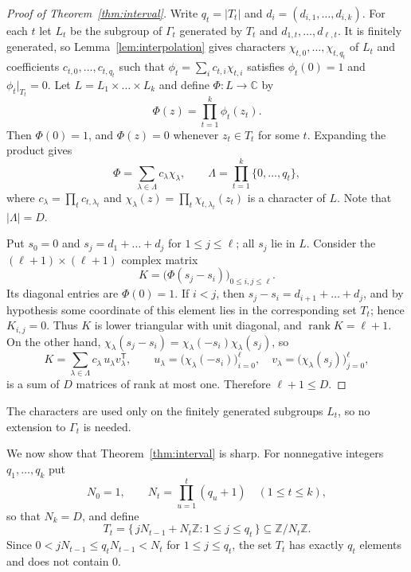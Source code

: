 \documentclass{amsart}
\theoremstyle{definition}
\theoremstyle{remark}
\newcommand{\C}{\mathbb{C}}
\newcommand{\Z}{\mathbb{Z}}
\begin{document}
\begin{proof}[Proof of Theorem~\ref{thm:interval}]
Write $q_t=|T_t|$ and $d_i=(d_{i,1},\dots,d_{i,k})$. For each $t$ let $L_t$ be the subgroup of $\Gamma_t$ generated by $T_t$ and $d_{1,t},\dots,d_{\ell,t}$. It is finitely generated, so Lemma~\ref{lem:interpolation} gives characters $\chi_{t,0},\dots,\chi_{t,q_t}$ of $L_t$ and coefficients $c_{t,0},\dots,c_{t,q_t}$ such that $\phi_t=\sum_i c_{t,i}\chi_{t,i}$ satisfies $\phi_t(0)=1$ and $\phi_t|_{T_t}=0$. Let $L=L_1\times\dots\times L_k$ and define $\Phi\colon L\to\C$ by
\[
\Phi(z)=\prod_{t=1}^k\phi_t(z_t).
\]
Then $\Phi(0)=1$, and $\Phi(z)=0$ whenever $z_t\in T_t$ for some $t$. Expanding the product gives
\[
\Phi=\sum_{\lambda\in\Lambda}c_\lambda\chi_\lambda,\qquad \Lambda=\prod_{t=1}^k\{0,\dots,q_t\},
\]
where $c_\lambda=\prod_t c_{t,\lambda_t}$ and $\chi_\lambda(z)=\prod_t\chi_{t,\lambda_t}(z_t)$ is a character of $L$. Note that $|\Lambda|=D$.

Put $s_0=0$ and $s_j=d_1+\dots+d_j$ for $1\le j\le\ell$; all $s_j$ lie in $L$. Consider the $(\ell+1)\times(\ell+1)$ complex matrix
\[
K=\bigl(\Phi(s_j-s_i)\bigr)_{0\le i,j\le\ell}.
\]
Its diagonal entries are $\Phi(0)=1$. If $i<j$, then $s_j-s_i=d_{i+1}+\dots+d_j$, and by hypothesis some coordinate of this element lies in the corresponding set $T_t$; hence $K_{i,j}=0$. Thus $K$ is lower triangular with unit diagonal, and $\operatorname{rank}K=\ell+1$. On the other hand, $\chi_\lambda(s_j-s_i)=\chi_\lambda(-s_i)\chi_\lambda(s_j)$, so
\[
K=\sum_{\lambda\in\Lambda}c_\lambda\,u_\lambda v_\lambda^{\mathsf T},\qquad u_\lambda=\bigl(\chi_\lambda(-s_i)\bigr)_{i=0}^{\ell},\quad v_\lambda=\bigl(\chi_\lambda(s_j)\bigr)_{j=0}^{\ell},
\]
is a sum of $D$ matrices of rank at most one. Therefore $\ell+1\le D$.
\end{proof}

The characters are used only on the finitely generated subgroups $L_t$, so no extension to $\Gamma_t$ is needed.

We now show that Theorem~\ref{thm:interval} is sharp. For nonnegative integers $q_1,\dots,q_k$ put
\begin{equation}\label{eq:N}
N_0=1,\qquad N_t=\prod_{u=1}^t(q_u+1)\quad(1\le t\le k),
\end{equation}
so that $N_k=D$, and define
\begin{equation}\label{eq:T}
T_t=\{\,jN_{t-1}+N_t\Z : 1\le j\le q_t\,\}\subseteq\Z/N_t\Z.
\end{equation}
Since $0<jN_{t-1}\le q_tN_{t-1}<N_t$ for $1\le j\le q_t$, the set $T_t$ has exactly $q_t$ elements and does not contain $0$.
\end{document}
